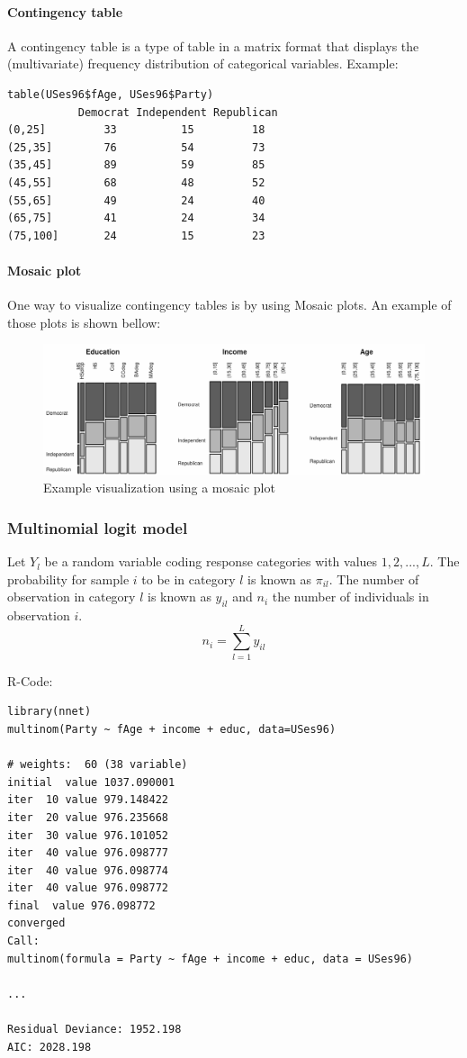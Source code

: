 \paragraph{Contingency table}
A contingency table is a type of table in a matrix format that displays the (multivariate) frequency distribution of categorical variables. Example:
\begin{lstlisting}
table(USes96$fAge, USes96$Party)
           Democrat Independent Republican
(0,25]         33          15         18
(25,35]        76          54         73
(35,45]        89          59         85
(45,55]        68          48         52
(55,65]        49          24         40
(65,75]        41          24         34
(75,100]       24          15         23
\end{lstlisting}

\paragraph{Mosaic plot}
One way to visualize contingency tables is by using Mosaic plots. An example of those plots is shown bellow:
\begin{figure}[H]
	\centering
	\includegraphics[width=.8\textwidth]{images/example-mosaic.png}
	\caption{Example visualization using a mosaic plot}
\end{figure}

\subsubsection{Multinomial logit model}
Let $Y_l$ be a random variable coding response categories with values $1, 2, ..., L$. The probability for sample $i$ to be in category $l$ is known as $\pi_{il}$. The number of observation in category $l$ is known as $y_{il}$ and $n_i$ the number of individuals in observation $i$.
\begin{equation*}
n_i = \sum_{l=1}^{L}y_{il}
\end{equation*}

R-Code:
\begin{lstlisting}
library(nnet)
multinom(Party ~ fAge + income + educ, data=USes96)

# weights:  60 (38 variable)
initial  value 1037.090001 
iter  10 value 979.148422
iter  20 value 976.235668
iter  30 value 976.101052
iter  40 value 976.098777
iter  40 value 976.098774
iter  40 value 976.098772
final  value 976.098772 
converged
Call:
multinom(formula = Party ~ fAge + income + educ, data = USes96)

...

Residual Deviance: 1952.198 
AIC: 2028.198 
\end{lstlisting}

